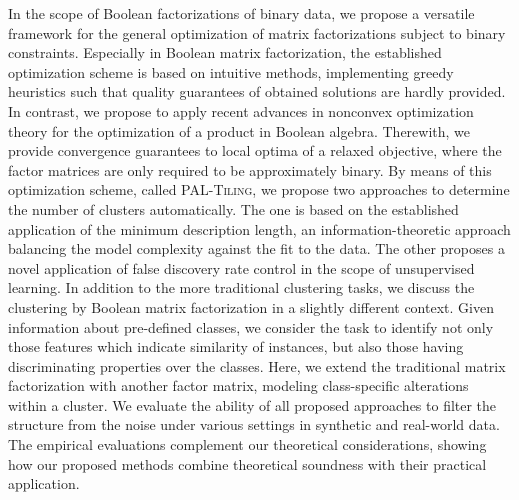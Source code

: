 In the scope of Boolean factorizations of binary data, we propose a versatile framework for the general optimization of matrix factorizations subject to binary constraints. Especially in Boolean matrix factorization, the established optimization scheme is based on intuitive methods, implementing greedy heuristics such that quality guarantees of obtained solutions are hardly provided. In contrast, we propose to apply recent advances in nonconvex optimization theory for the optimization of a product in Boolean algebra. Therewith, we provide convergence guarantees to local optima of a relaxed objective, where the factor matrices are only required to be approximately binary. By means of this optimization scheme, called \textsc{PAL-Tiling}, we propose two approaches to determine the number of clusters automatically. The one is based on the established application of the minimum description length, an information-theoretic approach balancing the model complexity against the fit to the data. The other proposes a novel application of false discovery rate control in the scope of unsupervised learning. In addition to the more traditional clustering tasks, we discuss the clustering by Boolean matrix factorization in a slightly different context. Given information about pre-defined classes, we consider the task to identify not only those features which indicate similarity of instances, but also those having discriminating properties over the classes. Here, we extend the traditional matrix factorization with another factor matrix, modeling class-specific alterations within a cluster. 
We evaluate the ability of all proposed approaches to filter the structure from the noise under various settings in synthetic and real-world data. The empirical evaluations complement our theoretical considerations, showing how our proposed methods combine theoretical soundness with their practical application. 
